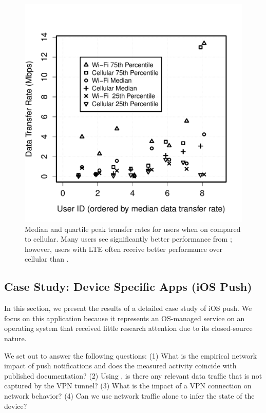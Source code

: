 \begin{figure}
\vspace{-2.5em}
\centering
        \includegraphics[width=\linewidth]{./plots/dataRate.pdf}
  \caption{Median and quartile peak transfer rates for users when on \wifi 
  compared to cellular. Many users see significantly better performance 
  from \wifi; however, users with LTE often receive better performance over 
  cellular than \wifi.}
  \label{fig:datarates}
  \vspace{\postfigspace}
\end{figure}

\subsection{Case Study: Device Specific Apps (iOS Push)}
\label{sec:case-study-ios}

In this section, we present the results of a detailed case study 
of iOS push. We focus on this application because it represents 
an OS-managed service on an operating system that received 
little research attention due to its closed-source nature. 

We set out to answer the following questions: (1) What is the 
empirical network impact of push notifications and does the 
measured activity coincide with published documentation?
(2) Using \meddle, is there any relevant data traffic that is 
not captured by the VPN tunnel? (3) What is the impact of 
a VPN connection on network behavior? (4) Can we use 
network traffic alone to infer the state of the device?

